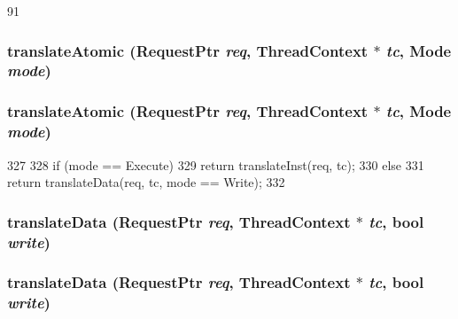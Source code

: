 \begin{DoxyCode}
91 {}
\end{DoxyCode}
\hypertarget{classMipsISA_1_1TLB_ad54e01e3c0a1613098a76b7f92e5be93}{
\subsubsection[{translateAtomic}]{ translateAtomic ({\bf RequestPtr} {\em req}, \/  {\bf ThreadContext} $\ast$ {\em tc}, \/  {\bf Mode} {\em mode})}}
\label{classMipsISA_1_1TLB_ad54e01e3c0a1613098a76b7f92e5be93}
\hypertarget{classMipsISA_1_1TLB_ad54e01e3c0a1613098a76b7f92e5be93}{
\subsubsection[{translateAtomic}]{ translateAtomic ({\bf RequestPtr} {\em req}, \/  {\bf ThreadContext} $\ast$ {\em tc}, \/  {\bf Mode} {\em mode})}}
\label{classMipsISA_1_1TLB_ad54e01e3c0a1613098a76b7f92e5be93}



\begin{DoxyCode}
327 {
328     if (mode == Execute)
329         return translateInst(req, tc);
330     else
331         return translateData(req, tc, mode == Write);
332 }
\end{DoxyCode}
\hypertarget{classMipsISA_1_1TLB_ad54aef66412f77e2a15a621a126dfb52}{
\subsubsection[{translateData}]{ translateData ({\bf RequestPtr} {\em req}, \/  {\bf ThreadContext} $\ast$ {\em tc}, \/  bool {\em write})}}
\label{classMipsISA_1_1TLB_ad54aef66412f77e2a15a621a126dfb52}
\hypertarget{classMipsISA_1_1TLB_ad54aef66412f77e2a15a621a126dfb52}{
\subsubsection[{translateData}]{ translateData ({\bf RequestPtr} {\em req}, \/  {\bf ThreadContext} $\ast$ {\em tc}, \/  bool {\em write})}}
\label{classMipsISA_1_1TLB_ad54aef66412f77e2a15a621a126dfb52}



